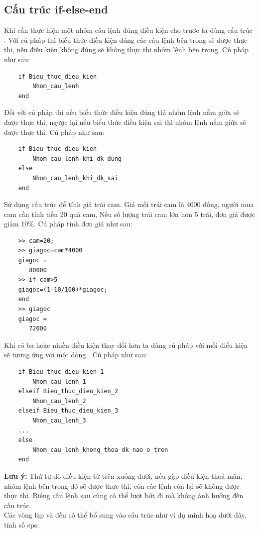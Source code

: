 \documentclass[12pt,a4paper]{article}
\begin{document}
\subsection{Cấu trúc if-else-end}
Khi cần thực hiện một nhóm câu lệnh đúng điều kiện cho trước ta dùng cấu trúc . Với cú pháp  thì biểu thức điều kiện đúng các câu lệnh bên trong sẽ được thực thi, nếu điều kiện không đúng sẽ không thực thi nhóm lệnh bên trong. Cú pháp như sau:
\begin{lstlisting}
	if Bieu_thuc_dieu_kien
		Nhom_cau_lenh
	end
\end{lstlisting}
Đối với cú pháp  thì nếu biểu thức điều kiện đúng thì nhóm lệnh nằm giữa  sẽ được thực thi, ngược lại nếu biểu thức điều kiện sai thì nhóm lệnh nằm giữa  sẽ được thực thi. Cú pháp như sau:
\begin{lstlisting}
	if Bieu_thuc_dieu_kien
		Nhom_cau_lenh_khi_dk_dung
	else
		Nhom_cau_lenh_khi_dk_sai
	end
\end{lstlisting}
\begin{example}
Sử dụng cấu trúc  để tính giá trái cam. Giá mỗi trái cam là 4000 đồng, người mua cam cần tính tiền 20 quả cam, Nếu số lượng trái cam lớn hơn 5 trái, đơn giá được giảm 10\%. Cú pháp tính đơn giá như sau:
\begin{lstlisting}
	>> cam=20;
	>> giagoc=cam*4000
	giagoc =
       80000
	>> if cam>5
	giagoc=(1-10/100)*giagoc;
	end
	>> giagoc
	giagoc =
       72000
\end{lstlisting}
\end{example}
Khi có ba hoặc nhiều điều kiện thay đổi hơn ta dùng cú pháp  với mỗi điểu kiện sẽ tương ứng với một dòng . Cú pháp như sau:
\begin{lstlisting}
	if Bieu_thuc_dieu_kien_1
		Nhom_cau_lenh_1
	elseif Bieu_thuc_dieu_kien_2
		Nhom_cau_lenh_2
	elseif Bieu_thuc_dieu_kien_3
		Nhom_cau_lenh_3
	...
	else
		Nhom_cau_lenh_khong_thoa_dk_nao_o_tren
	end
\end{lstlisting}
\textbf{Lưu ý:} Thứ tự dò điều kiện từ trên xuống dưới, nếu gặp điều kiện thoả mãn, nhóm lệnh bên trong đó sẽ được thực thi, còn các lệnh còn lại sẽ không được thực thi. Riêng câu lệnh  sau cùng có thể lượt bớt đi mà không ảnh hưởng đến cấu trúc.\\
Các vòng lặp  và  đều có thể bổ sung vào cấu trúc  như ví dụ minh hoạ dưới đây, tính số eps:
\begin{lstlisting}
	
\end{lstlisting}
\end{document}

